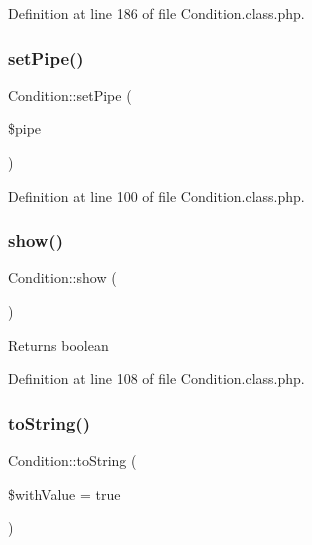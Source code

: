 Definition at line 186 of file Condition.\+class.\+php.

\mbox{\label{classCondition_a5b8810c0b90532ea2bb73561c6d2f986}} 
\subsubsection{\texorpdfstring{set\+Pipe()}{setPipe()}}
{\footnotesize\ttfamily Condition\+::set\+Pipe (\begin{DoxyParamCaption}\item[{}]{\$pipe }\end{DoxyParamCaption})}



Definition at line 100 of file Condition.\+class.\+php.

\mbox{\label{classCondition_a72cefb980f256f8c2ae6801e9c8868b9}} 
\subsubsection{\texorpdfstring{show()}{show()}}
{\footnotesize\ttfamily Condition\+::show (\begin{DoxyParamCaption}{ }\end{DoxyParamCaption})}

\begin{DoxyReturn}{Returns}
boolean 
\end{DoxyReturn}


Definition at line 108 of file Condition.\+class.\+php.

\mbox{\label{classCondition_aa4072b1db0e4f4d3a1dae0f1982781e1}} 
\subsubsection{\texorpdfstring{to\+String()}{toString()}}
{\footnotesize\ttfamily Condition\+::to\+String (\begin{DoxyParamCaption}\item[{}]{\$with\+Value = {\ttfamily true} }\end{DoxyParamCaption})}

